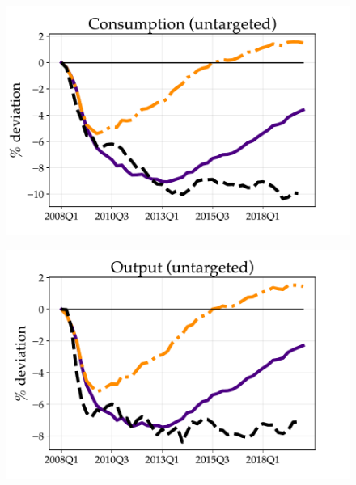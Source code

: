 \begin{figure}[H]
\medskip
\begin{minipage}{0.51\textwidth}
\includegraphics[scale=.55]{text/chapter1/Figures/GR_sim/PCE_IPR}
\label{fig:c}
\end{minipage}\hspace*{\fill}
\begin{minipage}{0.51\textwidth}
\includegraphics[scale=.55]{text/chapter1/Figures/GR_sim/GDP}
 \label{fig:d}
\end{minipage}


\end{figure}
